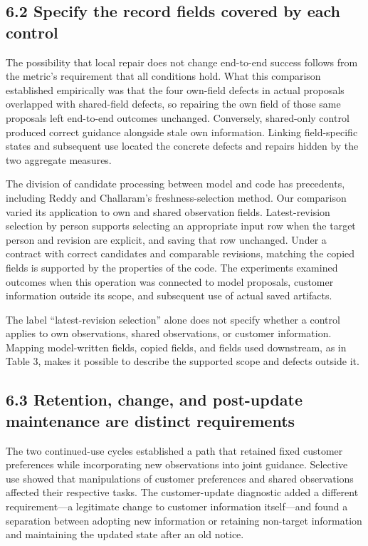 \documentclass[10pt,a4paper]{article}
\begin{document}
\subsection{6.2 Specify the record fields covered by each control}\label{paper-02-specify-the-record-fields-covered-by-each-control}

The possibility that local repair does not change end-to-end success follows from the metric's requirement that all conditions hold. What this comparison established empirically was that the four own-field defects in actual proposals overlapped with shared-field defects, so repairing the own field of those same proposals left end-to-end outcomes unchanged. Conversely, shared-only control produced correct guidance alongside stale own information. Linking field-specific states and subsequent use located the concrete defects and repairs hidden by the two aggregate measures.

The division of candidate processing between model and code has precedents, including Reddy and Challaram's freshness-selection method. Our comparison varied its application to own and shared observation fields. Latest-revision selection by person supports selecting an appropriate input row when the target person and revision are explicit, and saving that row unchanged. Under a contract with correct candidates and comparable revisions, matching the copied fields is supported by the properties of the code. The experiments examined outcomes when this operation was connected to model proposals, customer information outside its scope, and subsequent use of actual saved artifacts.

The label ``latest-revision selection'' alone does not specify whether a control applies to own observations, shared observations, or customer information. Mapping model-written fields, copied fields, and fields used downstream, as in Table 3, makes it possible to describe the supported scope and defects outside it.

\subsection{6.3 Retention, change, and post-update maintenance are distinct requirements}\label{paper-02-retention-change-and-post-update-maintenance-are-distinct-requirements}

The two continued-use cycles established a path that retained fixed customer preferences while incorporating new observations into joint guidance. Selective use showed that manipulations of customer preferences and shared observations affected their respective tasks. The customer-update diagnostic added a different requirement---a legitimate change to customer information itself---and found a separation between adopting new information or retaining non-target information and maintaining the updated state after an old notice.
\end{document}
